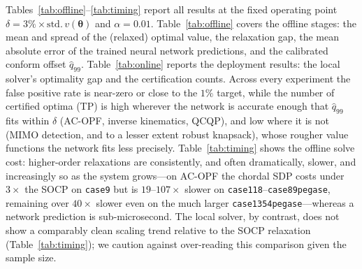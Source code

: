 \documentclass[10pt]{article} %
\theoremstyle{plain}
\theoremstyle{definition}
\theoremstyle{remark}
\begin{document}
Tables~\ref{tab:offline}--\ref{tab:timing} report all results at the fixed operating point $\delta = 3\% \times\mathrm{std.\,}v(\bm{\theta})$ and $\alpha = 0.01$. Table~\ref{tab:offline} covers the offline stages: the mean and spread of the (relaxed) optimal value, the relaxation gap, the mean absolute error of the trained neural network predictions, and the calibrated conform offset $\hat{q}_{99}$. Table~\ref{tab:online} reports the deployment results: the local solver's optimality gap and the certification counts. Across every experiment the false positive rate is near-zero or close to the $1\%$ target, while the number of certified optima (TP) is high wherever the network is accurate enough that $\hat{q}_{99}$ fits within $\delta$ (AC-OPF, inverse kinematics, QCQP), and low where it is not (MIMO detection, and to a lesser extent robust knapsack), whose rougher value functions the network fits less precisely. Table~\ref{tab:timing} shows the offline solve cost: higher-order relaxations are consistently, and often dramatically, slower, and increasingly so as the system grows---on AC-OPF the chordal SDP costs under $3\times$ the SOCP on \texttt{case9} but is $19$--$107\times$ slower on \texttt{case118}--\texttt{case89pegase}, remaining over $40\times$ slower even on the much larger \texttt{case1354pegase}---whereas a network prediction is sub-microsecond. The local solver, by contrast, does not show a comparably clean scaling trend relative to the SOCP relaxation (Table~\ref{tab:timing}); we caution against over-reading this comparison given the sample size.
\end{document}
